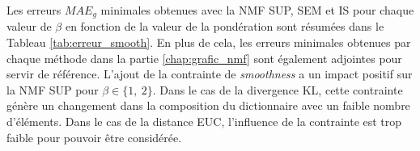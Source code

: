\begin{table}[h!]
\centering
\caption{Erreurs $MAE_{60}$ pour les combinaisons optimales de modalités des estimateurs pour le corpus d'évaluation \textit{SOUR} en présence d'une pondération de régularité temporelle.}
\label{tab:erreur_smooth}
\end{table}

Les erreurs $MAE_g$ minimales obtenues avec la NMF SUP, SEM et IS pour chaque valeur de $\beta$ en fonction de la valeur de la pondération sont résumées dans le Tableau \ref{tab:erreur_smooth}. En plus de cela, les erreurs minimales obtenues par chaque méthode dans la partie \ref{chap:grafic_nmf} sont également adjointes pour servir de référence.
L'ajout de la contrainte de \textit{smoothness} a un impact positif sur la NMF SUP pour $\beta \in \lbrace 1,~2 \rbrace$. Dans le cas de la divergence KL, cette contrainte génère un changement dans la composition du dictionnaire avec un faible nombre d'éléments. Dans le cas de la distance EUC, l'influence de la contrainte est trop faible pour pouvoir être considérée.

